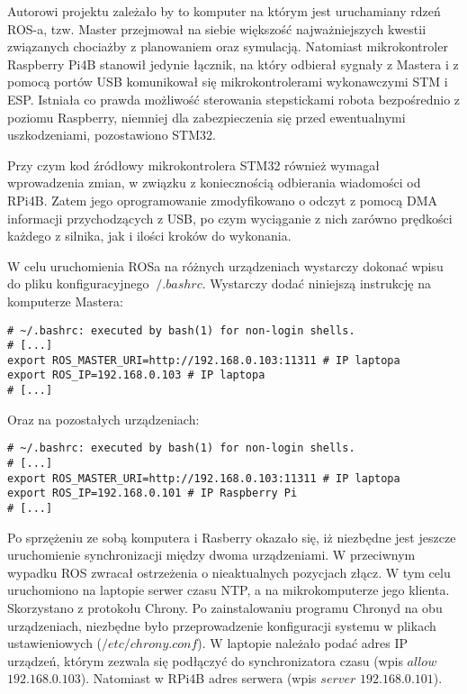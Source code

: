 Autorowi projektu zależało by to komputer na którym jest uruchamiany rdzeń ROS-a, tzw. Master przejmował na siebie większość najważniejszych kwestii związanych chociażby z planowaniem oraz symulacją. Natomiast mikrokontroler Raspberry Pi4B stanowił jedynie łącznik, na który odbierał sygnały z Mastera i z pomocą portów USB komunikował się mikrokontrolerami wykonawczymi STM i ESP. Istniała co prawda możliwość sterowania stepstickami robota bezpośrednio z poziomu Raspberry, niemniej dla zabezpieczenia się przed ewentualnymi uszkodzeniami, pozostawiono STM32.

Przy czym kod źródłowy mikrokontrolera STM32 również wymagał wprowadzenia zmian, w związku z koniecznością odbierania wiadomości od RPi4B. Zatem jego oprogramowanie zmodyfikowano o odczyt z pomocą DMA informacji przychodzących z USB, po czym wyciąganie z nich zarówno prędkości każdego z silnika, jak i ilości kroków do wykonania. 

W celu uruchomienia ROSa na różnych urządzeniach wystarczy dokonać wpisu do pliku konfiguracyjnego $~/.bashrc$. Wystarczy dodać niniejszą instrukcję na komputerze Mastera:

\begin{verbatim}
# ~/.bashrc: executed by bash(1) for non-login shells.
# [...]
export ROS_MASTER_URI=http://192.168.0.103:11311 # IP laptopa
export ROS_IP=192.168.0.103 # IP laptopa
# [...]
\end{verbatim}

Oraz na pozostałych urządzeniach:

\begin{verbatim}
# ~/.bashrc: executed by bash(1) for non-login shells.
# [...]
export ROS_MASTER_URI=http://192.168.0.103:11311 # IP laptopa
export ROS_IP=192.168.0.101 # IP Raspberry Pi
# [...]
\end{verbatim}

Po sprzężeniu ze sobą komputera i Rasberry okazało się, iż niezbędne jest jeszcze uruchomienie synchronizacji między dwoma urządzeniami. W przeciwnym wypadku ROS zwracał ostrzeżenia o nieaktualnych pozycjach złącz. W tym celu uruchomiono na laptopie serwer czasu NTP, a na mikrokomputerze jego klienta. Skorzystano z protokołu Chrony. Po zainstalowaniu programu Chronyd na obu urządzeniach, niezbędne było przeprowadzenie konfiguracji systemu w plikach ustawieniowych ($/etc/chrony.conf $). W laptopie należało podać adres IP urządzeń, którym zezwala się podłączyć do synchronizatora czasu (wpis $allow$ $192.168.0.103$). Natomiast w RPi4B adres serwera (wpis $server$ $192.168.0.101$).

